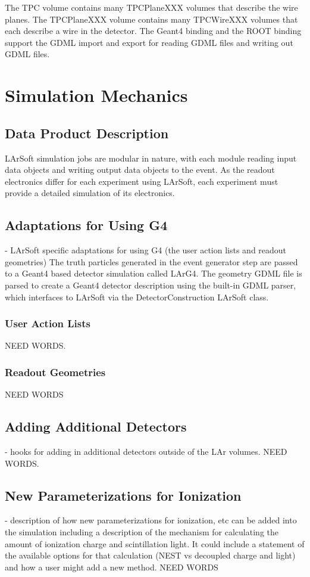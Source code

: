 \documentclass[12pt]{elsarticle}
\begin{document}
The TPC volume contains many TPCPlaneXXX volumes that describe the wire planes. The TPCPlaneXXX volume contains many TPCWireXXX volumes that each describe a wire in the detector. The Geant4 binding and the ROOT binding support the GDML import and export for reading GDML files and writing out GDML files.
                    
\section{Simulation Mechanics}

\subsection{Data Product Description}
LArSoft simulation jobs are modular in nature, with each module reading input data objects and writing output data objects to the event.  
As the readout electronics differ for each experiment using LArSoft, each
experiment must provide a detailed simulation of its electronics. 
\subsection{Adaptations for Using G4}
- LArSoft specific adaptations for using G4 (the user action lists and readout geometries)
The truth particles generated in the event generator step are passed to a Geant4 based detector simulation called LArG4.  The geometry GDML file is parsed to create a Geant4 detector description using the built-in GDML parser, which interfaces to LArSoft via the DetectorConstruction LArSoft class.
\subsubsection{User Action Lists}
NEED WORDS.
\subsubsection{Readout Geometries}
NEED WORDS
\subsection{Adding Additional Detectors}
- hooks for adding in additional detectors outside of the LAr volumes. 
NEED WORDS.
\subsection{New Parameterizations for Ionization}
- description of how new parameterizations for ionization, etc can be added into the simulation including a description of the mechanism for calculating the amount of ionization charge and scintillation light.  It could include a statement of the available options for that calculation (NEST vs decoupled charge and light) and how a user might add a new method.
NEED WORDS
\end{document}
